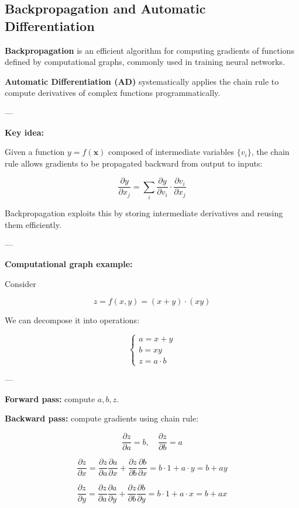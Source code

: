 \subsection{Backpropagation and Automatic Differentiation}

\textbf{Backpropagation} is an efficient algorithm for computing gradients of functions defined by computational graphs, commonly used in training neural networks.

\textbf{Automatic Differentiation (AD)} systematically applies the chain rule to compute derivatives of complex functions programmatically.

---

\textbf{Key idea:}

Given a function \( y = f(\mathbf{x}) \) composed of intermediate variables \( \{v_i\} \), the chain rule allows gradients to be propagated backward from output to inputs:

\[
\frac{\partial y}{\partial x_j} = \sum_i \frac{\partial y}{\partial v_i} \cdot \frac{\partial v_i}{\partial x_j}
\]

Backpropagation exploits this by storing intermediate derivatives and reusing them efficiently.

---

\textbf{Computational graph example:}

Consider

\[
z = f(x, y) = (x + y) \cdot (x y)
\]

We can decompose it into operations:

\[
\begin{cases}
a = x + y \\
b = x y \\
z = a \cdot b
\end{cases}
\]

---

\textbf{Forward pass:} compute \( a, b, z \).

\textbf{Backward pass:} compute gradients using chain rule:

\[
\frac{\partial z}{\partial a} = b, \quad \frac{\partial z}{\partial b} = a
\]

\[
\frac{\partial z}{\partial x} = \frac{\partial z}{\partial a} \frac{\partial a}{\partial x} + \frac{\partial z}{\partial b} \frac{\partial b}{\partial x} = b \cdot 1 + a \cdot y = b + a y
\]

\[
\frac{\partial z}{\partial y} = \frac{\partial z}{\partial a} \frac{\partial a}{\partial y} + \frac{\partial z}{\partial b} \frac{\partial b}{\partial y} = b \cdot 1 + a \cdot x = b + a x
\]

